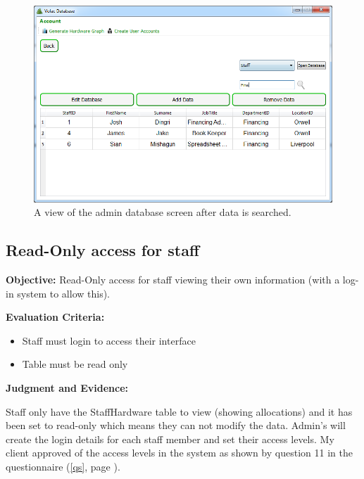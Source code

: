 \begin{figure}[H]
    \includegraphics[width=\textwidth]{./Evaluation/Images/afteradminsearch.png}
    \caption{A view of the admin database screen after data is searched.} 
\end{figure}

\subsection{Read-Only access for staff}

\textbf{Objective:} Read-Only access for staff viewing their own information (with a log-in system to allow this).

\textbf{Evaluation Criteria:}
\begin{itemize}
\item{Staff must login to access their interface}
\item{Table must be read only}
\end{itemize}

\textbf{Judgment and Evidence:}

Staff only have the StaffHardware table to view (showing allocations) and it has been set to read-only which means they can not modify the data. Admin's will create the login details for each staff member and set their access levels. My client approved of the access levels in the system as shown by question 11 in the questionnaire (\ref{qs}, page \pageref{qs}).

